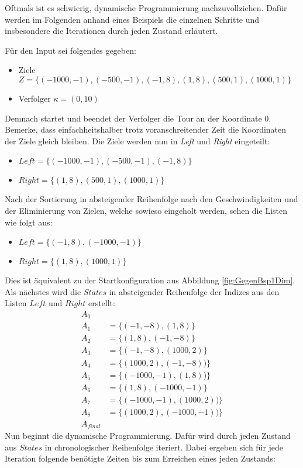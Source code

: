 \documentclass[german,version-2019-11]{uzl-thesis}
\begin{document}
Oftmals ist es schwierig, dynamische Programmierung nachzuvollziehen. Dafür werden im Folgenden anhand eines Beispiels die einzelnen Schritte und insbesondere die Iterationen durch jeden Zustand erläutert.
\begin{example}
Für den Input sei folgendes gegeben:
\begin{itemize}
\item Ziele $Z=\{(-1000,-1),(-500,-1),(-1,8),(1,8),(500,1),(1000,1)\}$
\item Verfolger $\kappa=(0,10)$
\end{itemize}
Demnach startet und beendet der Verfolger die Tour an der Koordinate $0$. Bemerke, dass einfachheitshalber trotz voranschreitender Zeit die Koordinaten der Ziele gleich bleiben. 
Die Ziele werden nun in \emph{Left} und \emph{Right} eingeteilt:
\begin{itemize}
\item $Left=\{(-1000,-1),(-500,-1),(-1,8)\}$ 
\item $Right=\{(1,8),(500,1),(1000,1)\}$
\end{itemize}
Nach der Sortierung in absteigender Reihenfolge nach den Geschwindigkeiten und der Eliminierung von Zielen, welche sowieso eingeholt werden, sehen die Listen wie folgt aus:
\begin{itemize}
\item $Left=\{(-1,8),(-1000,-1)\}$ 
\item $Right=\{(1,8),(1000,1)\}$
\end{itemize}
Dies ist äquivalent zu der Startkonfiguration aus Abbildung \ref{fig:GegenBsp1Dim}. Als nächstes wird die $States$ in absteigender Reihenfolge der Indizes aus den Listen $Left$ und $Right$ erstellt:
\begin{align*}
A_0&\\
A_1&=\{(-1, -8), (1, 8)\}\\
A_2&=\{(1, 8), (-1, -8)\}\\ 
A_3&=\{(-1, -8), (1000, 2)\}\\
A_4&=\{(1000, 2), (-1, -8))\}\\
A_5&=\{(-1000, -1), (1, 8))\}\\
A_6&=\{(1, 8), (-1000, -1)\}\\
A_7&=\{(-1000, -1), (1000, 2))\}\\
A_8&=\{(1000, 2), (-1000, -1))\}\\
A_{final}&
\end{align*}
Nun beginnt die dynamische Programmierung. Dafür wird durch jeden Zustand aus $States$ in chronologischer Reihenfolge iteriert. Dabei ergeben sich für jede Iteration folgende benötigte Zeiten bis zum Erreichen eines jeden Zustands:

\end{example}
\end{document}

